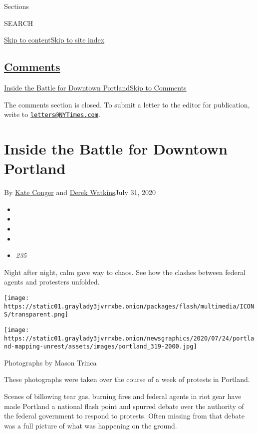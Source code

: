 Sections

SEARCH

\protect\hyperlink{site-content}{Skip to
content}\protect\hyperlink{site-index}{Skip to site index}

\hypertarget{comments}{%
\subsection{\texorpdfstring{\protect\hyperlink{commentsContainer}{Comments}}{Comments}}\label{comments}}

\href{}{Inside the Battle for Downtown Portland}\href{}{Skip to
Comments}

The comments section is closed. To submit a letter to the editor for
publication, write to
\href{mailto:letters@NYTimes.com}{\nolinkurl{letters@NYTimes.com}}.

\hypertarget{inside-the-battle-for-downtown-portland}{%
\section{Inside the Battle for Downtown
Portland}\label{inside-the-battle-for-downtown-portland}}

By \href{https://www.nytimes3xbfgragh.onion/by/kate-conger}{Kate Conger}
and \href{https://www.nytimes3xbfgragh.onion/by/derek-watkins}{Derek
Watkins}July 31, 2020

\begin{itemize}
\item
\item
\item
\item
\item
  \emph{235}
\end{itemize}

Night after night, calm gave way to chaos. See how the clashes between
federal agents and protesters unfolded.

\texttt{[image: https://static01.graylady3jvrrxbe.onion/packages/flash/multimedia/ICONS/transparent.png]}

\texttt{[image: https://static01.graylady3jvrrxbe.onion/newsgraphics/2020/07/24/portland-mapping-unrest/assets/images/portland\_319-2000.jpg]}

Photographs by Mason Trinca

These photographs were taken over the course of a week of protests in
Portland.

Scenes of billowing tear gas, burning fires and federal agents in riot
gear have made Portland a national flash point and spurred debate over
the authority of the federal government to respond to protests. Often
missing from that debate was a full picture of what was happening on the
ground.

